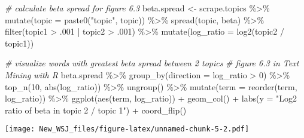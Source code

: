 \documentclass[
]{article}
\newenvironment{Shaded}{\begin{snugshade}}{\end{snugshade}}
\newcommand{\AttributeTok}[1]{\textcolor[rgb]{0.77,0.63,0.00}{#1}}
\newcommand{\CommentTok}[1]{\textcolor[rgb]{0.56,0.35,0.01}{\textit{#1}}}
\newcommand{\DecValTok}[1]{\textcolor[rgb]{0.00,0.00,0.81}{#1}}
\newcommand{\FunctionTok}[1]{\textcolor[rgb]{0.00,0.00,0.00}{#1}}
\newcommand{\NormalTok}[1]{#1}
\newcommand{\OtherTok}[1]{\textcolor[rgb]{0.56,0.35,0.01}{#1}}
\newcommand{\SpecialCharTok}[1]{\textcolor[rgb]{0.00,0.00,0.00}{#1}}
\newcommand{\StringTok}[1]{\textcolor[rgb]{0.31,0.60,0.02}{#1}}
\begin{document}
\begin{Shaded}
\begin{Highlighting}[]
\CommentTok{\# calculate beta spread for figure 6.3}
\NormalTok{beta.spread }\OtherTok{\textless{}{-}}\NormalTok{ scrape.topics }\SpecialCharTok{\%\textgreater{}\%}
  \FunctionTok{mutate}\NormalTok{(}\AttributeTok{topic =} \FunctionTok{paste0}\NormalTok{(}\StringTok{"topic"}\NormalTok{, topic)) }\SpecialCharTok{\%\textgreater{}\%}
  \FunctionTok{spread}\NormalTok{(topic, beta) }\SpecialCharTok{\%\textgreater{}\%}
  \FunctionTok{filter}\NormalTok{(topic1 }\SpecialCharTok{\textgreater{}}\NormalTok{ .}\DecValTok{001} \SpecialCharTok{|}\NormalTok{ topic2 }\SpecialCharTok{\textgreater{}}\NormalTok{ .}\DecValTok{001}\NormalTok{) }\SpecialCharTok{\%\textgreater{}\%}
  \FunctionTok{mutate}\NormalTok{(}\AttributeTok{log\_ratio =} \FunctionTok{log2}\NormalTok{(topic2 }\SpecialCharTok{/}\NormalTok{ topic1))}

\CommentTok{\# visualize words with greatest beta spread between 2 topics}
\CommentTok{\# figure 6.3 in Text Mining with R}
\NormalTok{beta.spread }\SpecialCharTok{\%\textgreater{}\%}
  \FunctionTok{group\_by}\NormalTok{(}\AttributeTok{direction =}\NormalTok{ log\_ratio }\SpecialCharTok{\textgreater{}} \DecValTok{0}\NormalTok{) }\SpecialCharTok{\%\textgreater{}\%}
  \FunctionTok{top\_n}\NormalTok{(}\DecValTok{10}\NormalTok{, }\FunctionTok{abs}\NormalTok{(log\_ratio)) }\SpecialCharTok{\%\textgreater{}\%}
  \FunctionTok{ungroup}\NormalTok{() }\SpecialCharTok{\%\textgreater{}\%}
  \FunctionTok{mutate}\NormalTok{(}\AttributeTok{term =} \FunctionTok{reorder}\NormalTok{(term, log\_ratio)) }\SpecialCharTok{\%\textgreater{}\%}
  \FunctionTok{ggplot}\NormalTok{(}\FunctionTok{aes}\NormalTok{(term, log\_ratio)) }\SpecialCharTok{+}
  \FunctionTok{geom\_col}\NormalTok{() }\SpecialCharTok{+}
  \FunctionTok{labs}\NormalTok{(}\AttributeTok{y =} \StringTok{"Log2 ratio of beta in topic 2 / topic 1"}\NormalTok{) }\SpecialCharTok{+}
  \FunctionTok{coord\_flip}\NormalTok{()}
\end{Highlighting}
\end{Shaded}

\texttt{[image: New\_WSJ\_files/figure-latex/unnamed-chunk-5-2.pdf]}
\end{document}
